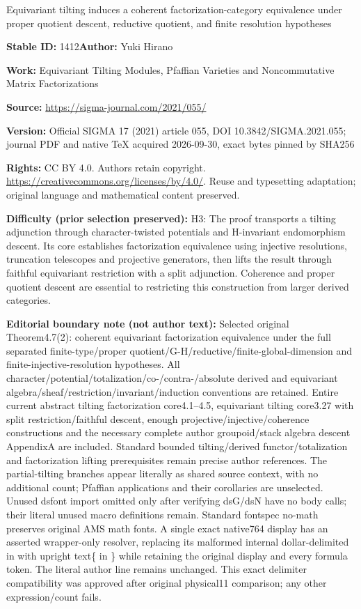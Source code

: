 \documentclass[11pt]{article}
\numberwithin{equation}{section}
\numberwithin{equation}{section}
\begin{document}
\begin{center}\Large Equivariant tilting induces a coherent factorization-category equivalence under proper quotient descent, reductive quotient, and finite resolution hypotheses\end{center}
\noindent\textbf{Stable ID:} 1412\quad\textbf{Author:} Yuki Hirano\par
\noindent\textbf{Work:} Equivariant Tilting Modules, Pfaffian Varieties and Noncommutative Matrix Factorizations\par
\noindent\textbf{Source:} \url{https://sigma-journal.com/2021/055/}\par
\noindent\textbf{Version:} Official SIGMA 17 (2021) article 055, DOI 10.3842/SIGMA.2021.055; journal PDF and native TeX acquired 2026-09-30, exact bytes pinned by SHA256\par
\noindent\textbf{Rights:} CC BY 4.0. Authors retain copyright. \url{https://creativecommons.org/licenses/by/4.0/}. Reuse and typesetting adaptation; original language and mathematical content preserved.\par
\noindent\textbf{Difficulty (prior selection preserved):} {\CJKfont H3: The proof transports a tilting adjunction through character-twisted potentials and H-invariant endomorphism descent. Its core establishes factorization equivalence using injective resolutions, truncation telescopes and projective generators, then lifts the result through faithful equivariant restriction with a split adjunction. Coherence and proper quotient descent are essential to restricting this construction from larger derived categories.}\par
\medskip\noindent\textbf{Editorial boundary note (not author text):} Selected original Theorem4.7(2): coherent equivariant factorization equivalence under the full separated finite-type/proper quotient/G-H/reductive/finite-global-dimension and finite-injective-resolution hypotheses. All character/potential/totalization/co-/contra-/absolute derived and equivariant algebra/sheaf/restriction/invariant/induction conventions are retained. Entire current abstract tilting factorization core4.1–4.5, equivariant tilting core3.27 with split restriction/faithful descent, enough projective/injective/coherence constructions and the necessary complete author groupoid/stack algebra descent AppendixA are included. Standard bounded tilting/derived functor/totalization and factorization lifting prerequisites remain precise author references. The partial-tilting branches appear literally as shared source context, with no additional count; Pfaffian applications and their corollaries are unselected. Unused dsfont import omitted only after verifying dsG/dsN have no body calls; their literal unused macro definitions remain. Standard fontspec no-math preserves original AMS math fonts. A single exact native764 display has an asserted wrapper-only resolver, replacing its malformed internal dollar-delimited in with upright text\{ in \} while retaining the original display and every formula token. The literal author line remains unchanged. This exact delimiter compatibility was approved after original physical11 comparison; any other expression/count fails.\par
\end{document}
